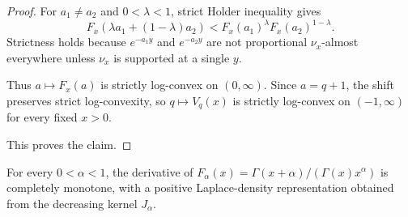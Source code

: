 \begin{proof}
For \(a_1\ne a_2\) and \(0<\lambda<1\), strict Holder inequality gives
\[
F_x(\lambda a_1+(1-\lambda)a_2)
<
F_x(a_1)^\lambda F_x(a_2)^{1-\lambda}.
\]
Strictness holds because \(e^{-a_1y}\) and \(e^{-a_2y}\) are not proportional \(\nu_x\)-almost everywhere unless \(\nu_x\) is supported at a single \(y\).

Thus \(a\mapsto F_x(a)\) is strictly log-convex on \((0,\infty)\). Since \(a=q+1\), the shift preserves strict log-convexity, so \(q\mapsto V_q(x)\) is strictly log-convex on \((-1,\infty)\) for every fixed \(x>0\).

This proves the claim.
\end{proof}

\begin{theorem}
\label{res:simon-gamma-quotient-derivative-positive-laplace-density}
For every \(0<\alpha<1\), the derivative of \(F_\alpha(x)=\Gamma(x+\alpha)/(\Gamma(x)x^\alpha)\) is completely monotone, with a positive Laplace-density representation obtained from the decreasing kernel \(J_\alpha\).
\end{theorem}
